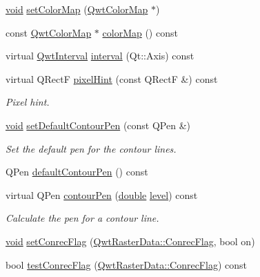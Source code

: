 \begin{DoxyCompactItemize}
\item 
\hyperlink{group___u_a_v_objects_plugin_ga444cf2ff3f0ecbe028adce838d373f5c}{void} \hyperlink{class_qwt_plot_spectrogram_a55375b61c01962b06ad222c980ca2dcc}{set\-Color\-Map} (\hyperlink{class_qwt_color_map}{Qwt\-Color\-Map} $\ast$)
\item 
const \hyperlink{class_qwt_color_map}{Qwt\-Color\-Map} $\ast$ \hyperlink{class_qwt_plot_spectrogram_ac1f691f612643bae921cbc108f8d2b5e}{color\-Map} () const 
\item 
virtual \hyperlink{class_qwt_interval}{Qwt\-Interval} \hyperlink{class_qwt_plot_spectrogram_a958a45464b5946aff31b7d28b7cfb5f9}{interval} (Qt\-::\-Axis) const 
\item 
virtual Q\-Rect\-F \hyperlink{class_qwt_plot_spectrogram_a9b06ef6a2526da8715615d07fdb31a95}{pixel\-Hint} (const Q\-Rect\-F \&) const 
\begin{DoxyCompactList}\small\item\em Pixel hint. \end{DoxyCompactList}\item 
\hyperlink{group___u_a_v_objects_plugin_ga444cf2ff3f0ecbe028adce838d373f5c}{void} \hyperlink{class_qwt_plot_spectrogram_afa3dea62acc8e5607e84bff8f50804b8}{set\-Default\-Contour\-Pen} (const Q\-Pen \&)
\begin{DoxyCompactList}\small\item\em Set the default pen for the contour lines. \end{DoxyCompactList}\item 
Q\-Pen \hyperlink{class_qwt_plot_spectrogram_a0b5964a44f4c0ed0139681c6873ada73}{default\-Contour\-Pen} () const 
\item 
virtual Q\-Pen \hyperlink{class_qwt_plot_spectrogram_a9c5c16fcda0422739c5393e42be5af37}{contour\-Pen} (\hyperlink{_super_l_u_support_8h_a8956b2b9f49bf918deed98379d159ca7}{double} \hyperlink{glext_8h_abc60a79088789bd61297bf5f9ff500d1}{level}) const 
\begin{DoxyCompactList}\small\item\em Calculate the pen for a contour line. \end{DoxyCompactList}\item 
\hyperlink{group___u_a_v_objects_plugin_ga444cf2ff3f0ecbe028adce838d373f5c}{void} \hyperlink{class_qwt_plot_spectrogram_adcec06278d4ff4b8dd3a85e2ef188d7b}{set\-Conrec\-Flag} (\hyperlink{class_qwt_raster_data_ac0053b66315fde6f0a9a69c40d7c5dcc}{Qwt\-Raster\-Data\-::\-Conrec\-Flag}, bool on)
\item 
bool \hyperlink{class_qwt_plot_spectrogram_a00e9f22015d793458ceb36c691b1b154}{test\-Conrec\-Flag} (\hyperlink{class_qwt_raster_data_ac0053b66315fde6f0a9a69c40d7c5dcc}{Qwt\-Raster\-Data\-::\-Conrec\-Flag}) const 

\end{DoxyCompactItemize}
